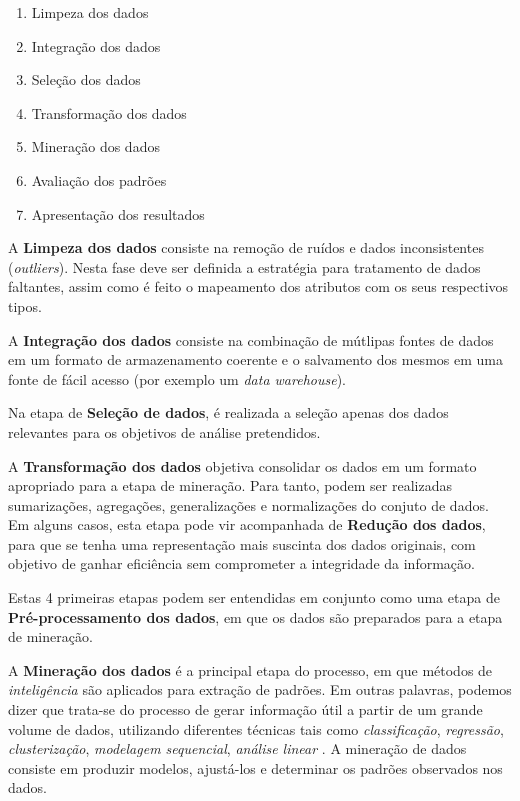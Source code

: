 \documentclass[
	article,			%
	11pt,				%
	oneside,			%
	a4paper,			%
	english,			%
	brazil,				%
	sumario=tradicional
	]{abntex2}
\begin{document}
\begin{enumerate}
  \item Limpeza dos dados
  \item Integração dos dados
  \item Seleção dos dados
  \item Transformação dos dados
  \item Mineração dos dados
  \item Avaliação dos padrões
  \item Apresentação dos resultados
\end{enumerate}

A \textbf{Limpeza dos dados} consiste na remoção de ruídos e dados
inconsistentes (\textit{outliers}). Nesta fase deve ser definida a estratégia
para tratamento de dados faltantes, assim como é feito o mapeamento dos
atributos com os seus respectivos tipos.

A \textbf{Integração dos dados} consiste na combinação de mútlipas fontes de
dados em um formato de armazenamento coerente e o salvamento dos mesmos em uma
fonte de fácil acesso (por exemplo um \textit{data warehouse}).

Na etapa de \textbf{Seleção de dados}, é realizada a seleção apenas dos dados
relevantes para os objetivos de análise pretendidos.

A \textbf{Transformação dos dados} objetiva consolidar os dados em um formato
apropriado para a etapa de mineração. Para tanto, podem ser realizadas
sumarizações, agregações, generalizações e normalizações do conjuto de dados.
Em alguns casos, esta etapa pode vir acompanhada de \textbf{Redução dos dados},
para que se tenha uma representação mais suscinta dos dados originais, com
objetivo de ganhar eficiência sem comprometer a integridade da informação.

Estas 4 primeiras etapas podem ser entendidas em conjunto como uma etapa de
\textbf{Pré-processamento dos dados}, em que os dados são preparados para a
etapa de mineração.

A \textbf{Mineração dos dados} é a principal etapa do processo, em que métodos
de \textit{inteligência} são aplicados para extração de padrões. Em outras
palavras, podemos dizer que trata-se do processo de gerar informação útil a
partir de um grande volume de dados, utilizando diferentes técnicas tais como
\textit{classificação}, \textit{regressão}, \textit{clusterização},
\textit{modelagem sequencial}, \textit{análise linear} \cite{chehab2020}. A
mineração de dados consiste em produzir modelos, ajustá-los e determinar os
padrões observados nos dados.
\end{document}
